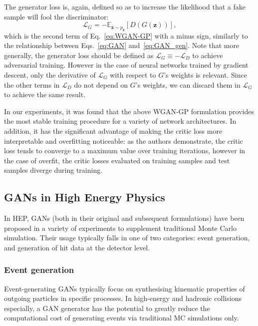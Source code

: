 The generator loss is, again, defined so as to increase the likelihood that a fake sample will fool the discriminator:
\begin{equation}\label{eq:WGAN-GP_gen}
    \mathcal{L}_G = 
    -\mathbb{E}_{\mathbf{z} \sim p_\mathbf{z}} \left[ D(G(\mathbf{z})) \right],
\end{equation}
which is the second term of Eq.~\ref{eq:WGAN-GP} with a minus sign, similarly to the relationship between Eqs.~\ref{eq:GAN} and~\ref{eq:GAN_gen}. Note that more generally, the generator loss should be defined as $\mathcal{L}_G \equiv -\mathcal{L}_D$ to achieve adversarial training. However in the case of neural networks trained by gradient descent, only the derivative of $\mathcal{L}_G$ with respect to $G$'s weights is relevant. Since the other terms in $\mathcal{L}_D$ do not depend on $G$'s weights, we can discard them in $\mathcal{L}_G$ to achieve the same result.

In our experiments, it was found that the above WGAN-GP formulation provides the most stable training procedure for a variety of network architectures. In addition, it has the significant advantage of making the critic loss more interpretable and overfitting noticeable: as the authors demonstrate, the critic loss tends to converge to a maximum value over training iterations, however in the case of overfit, the critic losses evaluated on training samples and test samples diverge during training.

\subsection{GANs in High Energy Physics}
In HEP, GANs (both in their original and subsequent formulations) have been proposed in a variety of experiments to supplement traditional Monte Carlo simulation. Their usage typically falls in one of two categories: event generation, and generation of hit data at the detector level.

\subsubsection{Event generation}
Event-generating GANs typically focus on synthesising kinematic properties of outgoing particles in specific processes. In high-energy and hadronic collisions especially, a GAN generator has the potential to greatly reduce the computational cost of generating events via traditional MC simulations only.

